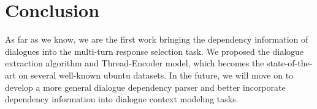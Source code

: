 \section{Conclusion}
As far as we know, we are the first work bringing the dependency information of 
dialogues into the multi-turn response selection task. We proposed the dialogue extraction algorithm 
and Thread-Encoder model, which becomes the state-of-the-art on several well-known 
ubuntu datasets. In the future, we will move on to develop a more general 
dialogue dependency parser and better incorporate dependency information into 
dialogue context modeling tasks.
